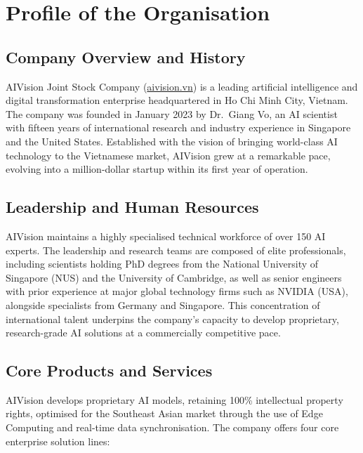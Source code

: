 \chapter{Profile of the Organisation}

\section{Company Overview and History}

AIVision Joint Stock Company (\url{aivision.vn}) is a leading artificial intelligence and digital transformation enterprise headquartered in Ho Chi Minh City, Vietnam. The company was founded in January 2023 by Dr.\ Giang Vo, an AI scientist with fifteen years of international research and industry experience in Singapore and the United States. Established with the vision of bringing world-class AI technology to the Vietnamese market, AIVision grew at a remarkable pace, evolving into a million-dollar startup within its first year of operation.

\section{Leadership and Human Resources}

AIVision maintains a highly specialised technical workforce of over 150 AI experts. The leadership and research teams are composed of elite professionals, including scientists holding PhD degrees from the National University of Singapore (NUS) and the University of Cambridge, as well as senior engineers with prior experience at major global technology firms such as NVIDIA (USA), alongside specialists from Germany and Singapore. This concentration of international talent underpins the company's capacity to develop proprietary, research-grade AI solutions at a commercially competitive pace.

\section{Core Products and Services}

AIVision develops proprietary AI models, retaining 100\% intellectual property rights, optimised for the Southeast Asian market through the use of Edge Computing and real-time data synchronisation. The company offers four core enterprise solution lines:

